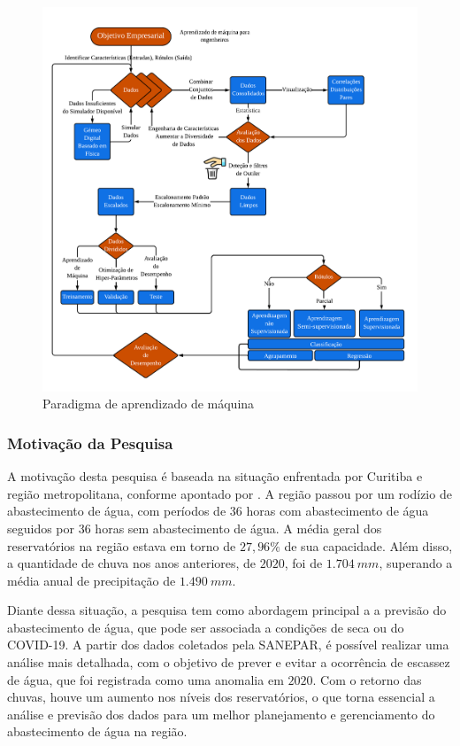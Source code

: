 \begin{figure}[H]
	\centering
	\caption{Paradigma de aprendizado de máquina}
	\includegraphics[width=\linewidth]{Introducao/Figuras/paradigma-ml}
	
	\label{fig:paradigma-ml}
\end{figure}
  
      
\subsubsection{Motiva\c c\~ao da Pesquisa} \label{subsubsec:motivacao}
 
 
A motivação desta pesquisa é baseada na situação enfrentada por Curitiba e região metropolitana, conforme apontado por \cite{vasconcelos_2020}. A região passou por um rodízio de abastecimento de água, com períodos de 36 horas com abastecimento de água seguidos por 36 horas sem abastecimento de água. A média geral dos reservatórios na região estava em torno de $27,96\%$ de sua capacidade. Além disso, a quantidade de chuva nos anos anteriores, de $2020$, foi de $1.704 \ mm$, superando a média anual de precipitação de $1.490 \ mm$.
 	
Diante dessa situação, a pesquisa tem como abordagem principal a a previsão do abastecimento de água, que pode ser associada a condições de seca ou do COVID-19. A partir dos dados coletados pela SANEPAR, é possível realizar uma análise mais detalhada, com o objetivo de prever e evitar a ocorrência de escassez de água, que foi registrada como uma anomalia em $2020$. Com o retorno das chuvas, houve um aumento nos níveis dos reservatórios, o que torna essencial a análise e previsão dos dados para um melhor planejamento e gerenciamento do abastecimento de água na região.
    
     
    